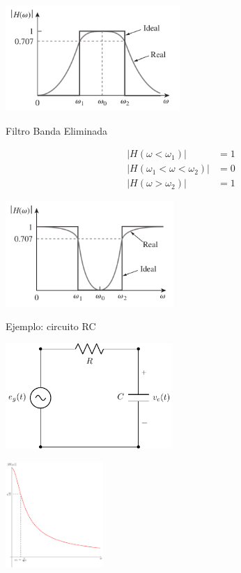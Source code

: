 \begin{center}
\includegraphics[height=4cm]{../figs/Filtro_PasoBanda.pdf}
\end{center}

{Filtro Banda Eliminada}

\begin{align*}
  |H(\omega < \omega_1)| &= 1\\
  |H(\omega_1 < \omega < \omega_2)| &= 0\\
  |H(\omega > \omega_2)| &= 1
\end{align*}

\begin{center}
\includegraphics[height=4cm]{../figs/Filtro_BandaEliminada.pdf}
\end{center}

{Ejemplo: circuito RC}

\begin{center}
\includegraphics[height=4cm]{../figs/filtroRC.pdf}
\end{center}

\begin{center}
\includegraphics[height=4cm]{../figs/Hw_RC.pdf}
\end{center}

